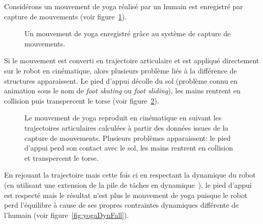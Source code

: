 Considérons un mouvement de yoga réalisé par
un humain est enregistré par capture de mouvements (voir figure~\ref{fig:yogaL}).
\begin{figure}[t]
  \begin{center}
  \end{center}
  \caption{Un mouvement de yoga enregistré gr\^ace au système de capture de mouvements.}
  \label{fig:yogaL}
\end{figure}
Si le mouvement
est converti en trajectoire articulaire et est appliqué directement 
sur le robot en cinématique, alors plusieurs problème liés 
à la différence de structures apparaissent. Le pied d'appui décolle du sol
(problème connu en animation sous le nom de \emph{foot skating} ou \emph{foot sliding}), 
les mains rentrent en collision puis transpercent le torse (voir figure~\ref{fig:yogaKine}). 
\begin{figure}[t]
  \begin{center}
  \end{center}
  \caption[Mouvement de yoga en cinématique.]{Le mouvement de yoga reproduit en cinématique en suivant les trajectoires articulaires
  calculées à partir des données issues de la capture de mouvements. Plusieurs problèmes apparaissent:
  le pied d'appui perd son contact avec le sol, les mains rentrent en collision et transpercent le torse.}
  \label{fig:yogaKine}
\end{figure}

En rejouant la trajectoire mais cette fois ci en respectant la dynamique du robot 
(en utilisant une extension de la pile de t\^aches en dynamique~\cite{saab11}), le 
pied d'appui est respecté mais le résultat n'est plus le mouvement de yoga puisque le robot perd
l'équilibre à cause de ses propres contraintes dynamiques différente de l'humain (voir figure~\ref{fig:yogaDynFall}).


